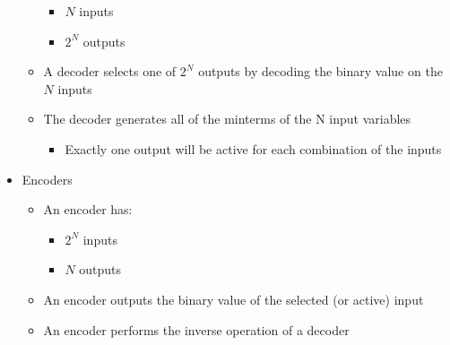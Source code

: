 \begin{itemize}
\begin{itemize}
        \begin{itemize}

          \item $N$ inputs

          \item $2^N$ outputs

        \end{itemize}

      \item A decoder selects one of $2^N$ outputs by decoding the binary value on the $N$ inputs

      \item The decoder generates all of the minterms of the N input variables

        \begin{itemize}

          \item Exactly one output will be active for each combination of the inputs

        \end{itemize}

    \end{itemize}

  \item Encoders

    \begin{itemize}

      \item An encoder has:

        \begin{itemize}

          \item $2^N$ inputs

          \item $N$ outputs

        \end{itemize}

      \item An encoder outputs the binary value of the selected (or active) input

      \item An encoder performs the inverse operation of a decoder

    \end{itemize}

\end{itemize}



